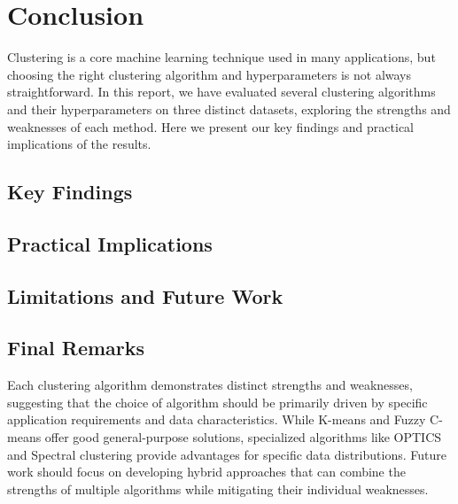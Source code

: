 \section{Conclusion}
\label{sec:conclusion}

Clustering is a core machine learning technique used in many applications, but choosing the right clustering algorithm and hyperparameters is not always straightforward. In this report, we have evaluated several clustering algorithms and their hyperparameters on three distinct datasets, exploring the strengths and weaknesses of each method. Here we present our key findings and practical implications of the results.

\subsection{Key Findings}

\subsection{Practical Implications}

\subsection{Limitations and Future Work}


\subsection{Final Remarks}

Each clustering algorithm demonstrates distinct strengths and weaknesses, suggesting that the choice of algorithm should be primarily driven by specific application requirements and data characteristics. While K-means and Fuzzy C-means offer good general-purpose solutions, specialized algorithms like OPTICS and Spectral clustering provide advantages for specific data distributions. Future work should focus on developing hybrid approaches that can combine the strengths of multiple algorithms while mitigating their individual weaknesses.

